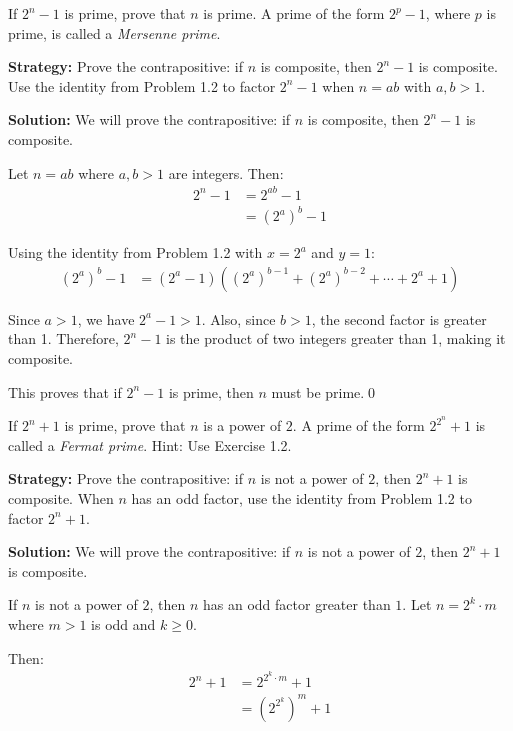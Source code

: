 \begin{problembox}
If $2^n - 1$ is prime, prove that $n$ is prime. A prime of the form $2^p - 1$, where $p$ is prime, is called a \textit{Mersenne prime}.
\end{problembox}

\noindent\textbf{Strategy:} Prove the contrapositive: if $n$ is composite, then $2^n - 1$ is composite. Use the identity from Problem 1.2 to factor $2^n - 1$ when $n = ab$ with $a, b > 1$.

\bigskip\noindent\textbf{Solution:}
We will prove the contrapositive: if $n$ is composite, then $2^n - 1$ is composite.

Let $n = ab$ where $a, b > 1$ are integers. Then:
\begin{align*}
2^n - 1 &= 2^{ab} - 1 \\
&= (2^a)^b - 1
\end{align*}

Using the identity from Problem 1.2 with $x = 2^a$ and $y = 1$:
\begin{align*}
(2^a)^b - 1 &= (2^a - 1)((2^a)^{b-1} + (2^a)^{b-2} + \cdots + 2^a + 1)
\end{align*}

Since $a > 1$, we have $2^a - 1 > 1$. Also, since $b > 1$, the second factor is greater than 1. Therefore, $2^n - 1$ is the product of two integers greater than 1, making it composite.

This proves that if $2^n - 1$ is prime, then $n$ must be prime.\qed



\begin{problembox}
If $2^n + 1$ is prime, prove that $n$ is a power of $2$. A prime of the form $2^{2^n} + 1$ is called a \textit{Fermat prime}. Hint: Use Exercise 1.2.
\end{problembox}

\noindent\textbf{Strategy:} Prove the contrapositive: if $n$ is not a power of $2$, then $2^n + 1$ is composite. When $n$ has an odd factor, use the identity from Problem 1.2 to factor $2^n + 1$.

\bigskip\noindent\textbf{Solution:}
We will prove the contrapositive: if $n$ is not a power of $2$, then $2^n + 1$ is composite.

If $n$ is not a power of $2$, then $n$ has an odd factor greater than $1$. Let $n = 2^k \cdot m$ where $m > 1$ is odd and $k \geq 0$.

Then:
\begin{align*}
2^n + 1 &= 2^{2^k \cdot m} + 1 \\
&= (2^{2^k})^m + 1
\end{align*}

